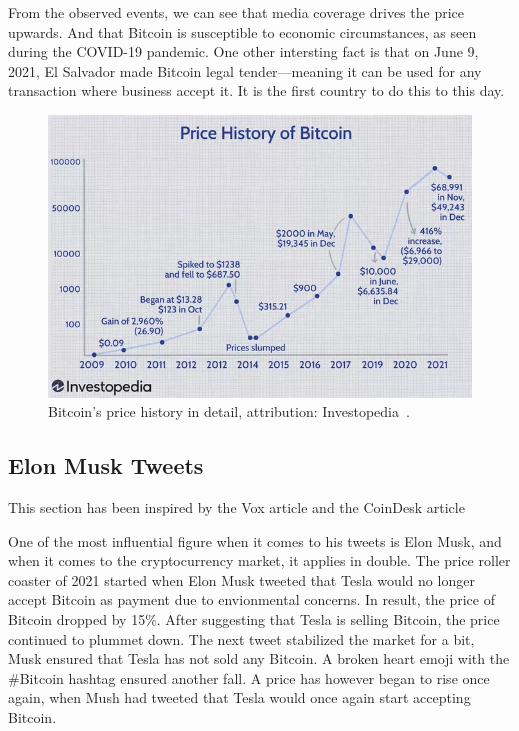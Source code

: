 From the observed events, we can see that media coverage drives the price upwards. And that Bitcoin is susceptible to economic circumstances, as seen during the COVID-19 pandemic. One other intersting fact is that on June 9, 2021, El Salvador made Bitcoin legal tender---meaning it can be used for any transaction where business accept it. It is the first country to do this to this day.

\begin{figure}[!hbt]
    \centering
    \includegraphics[width=\columnwidth]{figures/investopedia-bitcoin-price-history.png}
    \caption{Bitcoin's price history in detail, attribution: Investopedia~\cite{investopedia:bitcoin-price-history}.}
    \label{figure-investopedia-btc-history}
\end{figure}

\subsection*{Elon Musk Tweets}
This section has been inspired by the Vox article \cite{vox:elon} and the CoinDesk article \cite{coindesk:elon}

One of the most influential figure when it comes to his tweets is Elon Musk, and when it comes to the cryptocurrency market, it applies in double. The price roller coaster of 2021 started when Elon Musk tweeted that Tesla would no longer accept Bitcoin as payment due to envionmental concerns. In result, the price of Bitcoin dropped by 15\%. After suggesting that Tesla is selling Bitcoin, the price continued to plummet down. The next tweet stabilized the market for a bit, Musk ensured that Tesla has not sold any Bitcoin. A broken heart emoji with the \#Bitcoin hashtag ensured another fall. A price has however began to rise once again, when Mush had tweeted that Tesla would once again start accepting Bitcoin.

